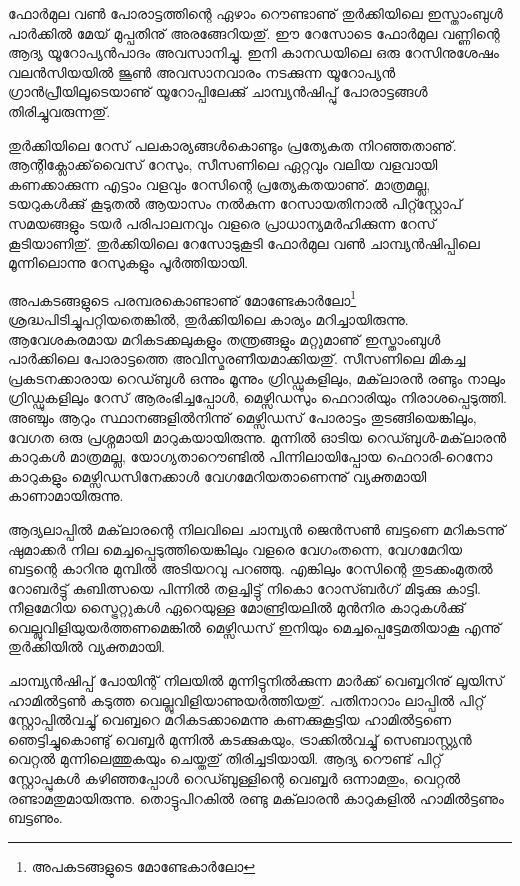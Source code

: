 ﻿
\vskip 2pt

ഫോര്‍മുല വണ്‍ പോരാട്ടത്തിന്റെ ഏഴാം റൌണ്ടാണു് തുര്‍ക്കിയിലെ ഇസ്താംബുള്‍ പാര്‍ക്കില്‍ മേയ് മുപ്പതിനു് 
അരങ്ങേറിയതു്. ഈ റേസോടെ ഫോര്‍മുല വണ്ണിന്റെ ആദ്യ യൂറോപ്യന്‍പാദം അവസാനിച്ചു. ഇനി കാനഡയിലെ 
ഒരു റേസിനുശേഷം വലന്‍സിയയില്‍ ജൂണ്‍ അവസാനവാരം നടക്കുന്ന യൂറോപ്യന്‍ ഗ്രാന്‍പ്രീയിലൂടെയാണു് 
യൂറോപ്പിലേക്കു് ചാമ്പ്യന്‍ഷിപ്പു് പോരാട്ടങ്ങള്‍ തിരിച്ചുവരുന്നതു്.

തുര്‍ക്കിയിലെ റേസ് പലകാര്യങ്ങള്‍കൊണ്ടും പ്രത്യേകത നിറഞ്ഞതാണു്. ആന്റിക്ലോക്ക്‌വൈസ് റേസും, സീസണിലെ 
ഏറ്റവും വലിയ വളവായി കണക്കാക്കുന്ന എട്ടാം വളവും റേസിന്റെ പ്രത്യേകതയാണു്. മാത്രമല്ല, ടയറുകള്‍ക്കു് കൂടുതല്‍ 
ആയാസം നല്‍കുന്ന റേസായതിനാല്‍ പിറ്റ്സ്റ്റോപ് സമയങ്ങളും ടയര്‍ പരിപാലനവും വളരെ പ്രാധാന്യമര്‍ഹിക്കുന്ന 
റേസ് കൂടിയാണിതു്. തുര്‍ക്കിയിലെ റേസോടുകൂടി ഫോര്‍മുല വണ്‍ ചാമ്പ്യന്‍ഷിപ്പിലെ മൂന്നിലൊന്നു റേസുകളും പൂര്‍ത്തിയായി.

അപകടങ്ങളുടെ പരമ്പരകൊണ്ടാണു് മോണ്ടേകാര്‍ലോ\footnote{അപകടങ്ങളുടെ മോണ്ടേകാര്‍ലോ} ശ്രദ്ധപിടിച്ചുപറ്റിയതെങ്കില്‍, 
തുര്‍ക്കിയിലെ കാര്യം മറിച്ചായിരുന്നു. ആവേശകരമായ മറികടക്കലുകളും തന്ത്രങ്ങളും 
മറ്റുമാണു് ഇസ്താംബുള്‍ പാര്‍ക്കിലെ പോരാട്ടത്തെ അവിസ്മരണീയമാക്കിയതു്. 
സീസണിലെ മികച്ച പ്രകടനക്കാരായ റെഡ്ബുള്‍ ഒന്നും മൂന്നും ഗ്രിഡ്ഡുകളിലും, മക്‌ലാരന്‍ രണ്ടും നാലും ഗ്രിഡ്ഡുകളിലും റേസ് 
ആരംഭിച്ചപ്പോള്‍, മെഴ്സിഡസും ഫെറാരിയും നിരാശപ്പെടുത്തി. അഞ്ചും ആറും സ്ഥാനങ്ങളില്‍നിന്നു് മെഴ്സിഡസ് പോരാട്ടം 
തുടങ്ങിയെങ്കിലും, വേഗത ഒരു പ്രശ്നമായി മാറുകയായിരുന്നു. മുന്നില്‍ ഓടിയ റെഡ്ബുള്‍-മക്‌ലാരന്‍ കാറുകള്‍ മാത്രമല്ല, 
യോഗ്യതാറൌണ്ടില്‍ പിന്നിലായിപ്പോയ ഫെറാരി-റെനോ കാറുകളും മെഴ്സിഡസിനേക്കാള്‍ വേഗമേറിയതാണെന്നു് 
വ്യക്തമായി കാണാമായിരുന്നു.

ആദ്യലാപ്പില്‍ മക്‌ലാരന്റെ നിലവിലെ ചാമ്പ്യന്‍ ജെന്‍സണ്‍ ബട്ടണെ മറികടന്നു് ഷുമാക്കര്‍ നില മെച്ചപ്പെടുത്തിയെങ്കിലും 
വളരെ വേഗംതന്നെ, വേഗമേറിയ ബട്ടന്റെ കാറിനു മുമ്പില്‍ അടിയറവു പറഞ്ഞു. എങ്കിലും റേസിന്റെ തുടക്കംമുതല്‍ റോബര്‍ട്ടു് 
കുബിത്സയെ പിന്നില്‍ തളച്ചിട്ടു് നികൊ റോസ്ബര്‍ഗ് മിടുക്കു കാട്ടി. നീളമേറിയ സ്ട്രൈറ്റുകള്‍ ഏറെയുള്ള മോണ്ട്രിയലില്‍ 
മുന്‍നിര കാറുകള്‍ക്കു് വെല്ലുവിളിയുയര്‍ത്തണമെങ്കില്‍ മെഴ്സിഡസ് ഇനിയും മെച്ചപ്പെട്ടേമതിയാകൂ എന്നു് തുര്‍ക്കിയില്‍ 
വ്യക്തമായി.

ചാമ്പ്യന്‍ഷിപ്പ് പോയിന്റ് നിലയില്‍ മുന്നിട്ടുനില്‍ക്കുന്ന മാര്‍ക്ക് വെബ്ബറിനു് ലൂയിസ് ഹാമില്‍ട്ടണ്‍ കടുത്ത 
വെല്ലുവിളിയാണുയര്‍ത്തിയതു്.  പതിനാറാം ലാപ്പില്‍ പിറ്റ് സ്റ്റോപ്പില്‍വച്ചു് വെബ്ബറെ മറികടക്കാമെന്നു കണക്കുകൂട്ടിയ 
ഹാമില്‍ട്ടണെ ഞെട്ടിച്ചുകൊണ്ടു് വെബ്ബര്‍ മുന്നില്‍ കടക്കുകയും, ട്രാക്കില്‍വച്ചു് സെബാസ്റ്റ്യന്‍ വെറ്റല്‍ മുന്നിലെത്തുകയും 
ചെയ്തതു് തിരിച്ചടിയായി. ആദ്യ റൌണ്ട് പിറ്റ് സ്റ്റോപ്പുകള്‍ കഴിഞ്ഞപ്പോള്‍ റെഡ്ബുള്ളിന്റെ വെബ്ബര്‍ ഒന്നാമതും, 
വെറ്റല്‍ രണ്ടാമതുമായിരുന്നു. തൊട്ടുപിറകില്‍ രണ്ടു മക്‌ലാരന്‍ കാറുകളില്‍ ഹാമില്‍ട്ടണും ബട്ടണും.

